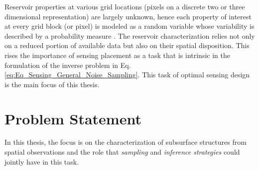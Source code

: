 Reservoir properties at various grid locations (pixels on a discrete two or three dimensional representation) are largely unknown, hence each property of interest at every grid block (or pixel) is modeled as a random variable whose variability is described by a probability measure \citep{gaoetal1996, brusheuvelink2007, Blackwell1998, Lloyd1998}. The reservoir characterization relies not only on a reduced portion of available data but also on their spatial disposition. This rises the importance of sensing placement as a task that is intrinsic in the formulation of the inverse problem in Eq. \eqref{eq:Eq_Sensing_General_Noise_Sampling}. This task of optimal sensing design is the main focus of this thesis.



































































\section{Problem Statement}

In this thesis, the focus is on the characterization of subsurface structures from spatial observations and the role that \emph{sampling} and \emph{inference strategies} could jointly have in this task. 

